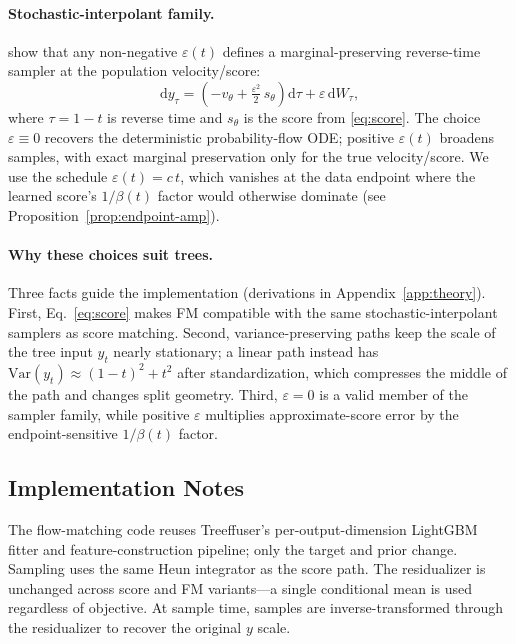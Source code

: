 \documentclass{tpm2026}
\newcommand{\Var}{\mathrm{Var}}
\newcommand{\dd}{\mathrm{d}}
\begin{document}
\paragraph{Stochastic-interpolant family.} \citet{albergo2023stochastic} show that any non-negative $\varepsilon(t)$ defines a marginal-preserving reverse-time sampler at the population velocity/score:
\begin{equation}\label{eq:sde}
\dd y_\tau = \left(-v_\theta + \tfrac{\varepsilon^2}{2}\, s_\theta\right) \dd \tau + \varepsilon\, \dd W_\tau,
\end{equation}
where $\tau = 1 - t$ is reverse time and $s_\theta$ is the score from \eqref{eq:score}. The choice $\varepsilon \equiv 0$ recovers the deterministic probability-flow ODE; positive $\varepsilon(t)$ broadens samples, with exact marginal preservation only for the true velocity/score. We use the schedule $\varepsilon(t) = c\, t$, which vanishes at the data endpoint where the learned score's $1/\beta(t)$ factor would otherwise dominate (see Proposition~\ref{prop:endpoint-amp}).

\paragraph{Why these choices suit trees.} Three facts guide the implementation (derivations in Appendix~\ref{app:theory}). First, Eq.~\eqref{eq:score} makes FM compatible with the same stochastic-interpolant samplers as score matching. Second, variance-preserving paths keep the scale of the tree input $y_t$ nearly stationary; a linear path instead has $\Var(y_t)\approx(1-t)^2+t^2$ after standardization, which compresses the middle of the path and changes split geometry. Third, $\varepsilon=0$ is a valid member of the sampler family, while positive $\varepsilon$ multiplies approximate-score error by the endpoint-sensitive $1/\beta(t)$ factor.

\subsection{Implementation Notes}\label{sec:impl}
The flow-matching code reuses Treeffuser's per-output-dimension LightGBM fitter and feature-construction pipeline; only the target and prior change. Sampling uses the same Heun integrator as the score path. The residualizer is unchanged across score and FM variants---a single conditional mean is used regardless of objective. At sample time, samples are inverse-transformed through the residualizer to recover the original $y$ scale.
\end{document}
